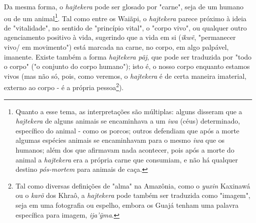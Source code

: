Da mesma forma, o \emph{hajtekera} pode ser glosado por "carne", seja de
um humano ou de um animal\footnote{Quanto a esse tema, as interpretações
  são múltiplas: alguns disseram que a \emph{hajtekera} de alguns
  animais se encaminhava a um \emph{iwa} (céus) determinado, específico
  do animal - como os porcos; outros defendiam que após a morte algumas
  espécies animais se encaminhavam para o mesmo \emph{iwa} que os
  humanos; além dos que afirmavam nada acontecer, pois após a morte do
  animal a \emph{hajtekera} era a própria carne que consumiam, e não há
  qualquer destino \emph{pós-mortem} para animais de caça.}. Tal como
entre os Waiãpi, o \emph{hajtekera} parece próximo à ideia de
"vitalidade", no sentido de "princípio vital", o "corpo vivo", ou
qualquer outro agenciamento positivo à vida, sugerindo que a vida em si
(\emph{ikwẽ}, "permanecer vivo/ em movimento") está marcada na carne, no
corpo, em algo palpável, imanente. Existe também a forma \emph{hajtekera
pãj}, que pode ser traduzida por "todo o corpo" ("o conjunto do corpo
humano"); isto é, o nosso corpo enquanto estamos vivos (mas não só,
pois, como veremos, o \emph{hajtekera} é de certa maneira imaterial,
externo ao corpo - é a própria pessoa\footnote{Tal como diversas
  definições de "alma" na Amazônia, como o \emph{yuxin} Kaxinawá ou o
  \emph{karõ} dos Khraô, a \emph{hajtekera} pode também ser traduzida
  como "imagem", seja em uma fotografia ou espelho, embora os Guajá
  tenham uma palavra específica para imagem, \emph{ija'ỹma}.}).

